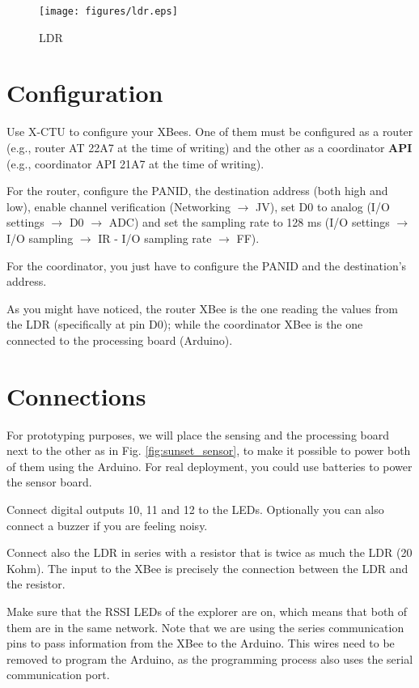 \begin{figure}[htbp]
  \centering
  \texttt{[image: figures/ldr.eps]}
  \caption{LDR}
  \label{fig:ldr}
\end{figure}

\section{Configuration}
Use X-CTU to configure your XBees.
One of them must be configured as a router (e.g., router AT 22A7 at the time of writing) and the other as a coordinator {\bfseries API} (e.g., coordinator API 21A7 at the time of writing).

For the router, configure the PANID, the destination address (both high and low), enable channel verification (Networking $\rightarrow$  JV), set D0 to analog (I/O settings $\rightarrow$  D0 $\rightarrow$  ADC) and set the sampling rate to 128 ms (I/O settings $\rightarrow$  I/O sampling $\rightarrow$  IR - I/O sampling rate $\rightarrow$  FF).

For the coordinator, you just have to configure the PANID and the destination's address.

As you might have noticed, the router XBee is the one reading the values from the LDR (specifically at pin D0); while the coordinator XBee is the one connected to the processing board (Arduino).

\section{Connections}

For prototyping purposes, we will place the sensing and the processing board next to the other as in Fig. \ref{fig:sunset_sensor}, to make it possible to power both of them using the Arduino.
For real deployment, you could use batteries to power the sensor board.

Connect digital outputs 10, 11 and 12 to the LEDs.
Optionally you can also connect a buzzer if you are feeling noisy.

Connect also the LDR in series with a resistor that is twice as much the LDR (20 Kohm).
The input to the XBee is precisely the connection between the LDR and the resistor.

Make sure that the RSSI LEDs of the explorer are on, which means that both of them are in the same network.
Note that we are using the series communication pins to pass information from the XBee to the Arduino.
This wires need to be removed to program the Arduino, as the programming process also uses the serial communication port.

